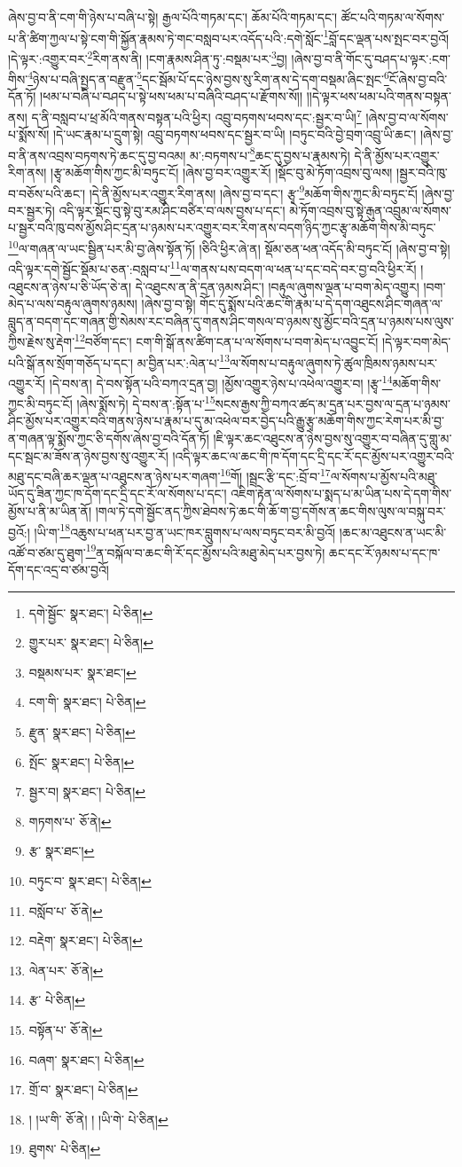 ཞེས་བྱ་བ་ནི་ངག་གི་ཉེས་པ་བཞི་པ་སྟེ། རྒྱལ་པོའི་གཏམ་དང་། ཆོམ་པོའི་གཏམ་དང་། ཚོང་པའི་གཏམ་ལ་སོགས་པ་ནི་ཚིག་ཀྱལ་པ་སྟེ་ངག་གི་སྐྱོན་རྣམས་ཏེ་གང་བསླབ་པར་འདོད་པའི་:དགེ་སློང་\footnote{དགེ་སྦྱོང་  སྣར་ཐང་།  པེ་ཅིན། }བློ་དང་ལྡན་པས་སྤང་བར་བྱའོ། །དེ་ལྟར་:འགྱུར་བར་\footnote{གྱུར་པར་  སྣར་ཐང་།  པེ་ཅིན། }རིག་ནས་ནི། །ངག་རྣམས་ཤིན་ཏུ་:བསྡམ་པར་\footnote{བསྡམས་པར་  སྣར་ཐང་། }བྱ། །ཞེས་བྱ་བ་ནི་གོང་དུ་བཤད་པ་ལྟར་:ངག་གིས་\footnote{ངག་གི་  སྣར་ཐང་།  པེ་ཅིན། }ཉེས་པ་བཞི་སྤྱད་ན་བརྫུན་\footnote{རྫུན་  སྣར་ཐང་།  པེ་ཅིན། }དང་སྦོམ་པོ་དང་ཉེས་བྱས་སུ་རིག་ནས་དེ་དག་བསྡམ་ཞིང་སྤང་\footnote{སྤོང་  སྣར་ཐང་།  པེ་ཅིན། }ངོ་ཞེས་བྱ་བའི་དོན་ཏོ། །ཕམ་པ་བཞི་པ་བཤད་པ་སྟེ་ཕས་ཕམ་པ་བཞིའི་བཤད་པ་རྫོགས་སོ།། །།དེ་ལྟར་ཕས་ཕམ་པའི་གནས་བསྟན་ནས། ད་ནི་བསླབ་པ་ཕྲ་མོའི་གནས་བསྟན་པའི་ཕྱིར། འབྲུ་བཏགས་ཕབས་དང་:སྦྱར་བ་ཡི།\footnote{སྦྱར་བ།  སྣར་ཐང་།  པེ་ཅིན། } །ཞེས་བྱ་བ་ལ་སོགས་པ་སྨོས་སོ། །དེ་ཡང་རྣམ་པ་དྲུག་སྟེ། འབྲུ་བཏགས་ཕབས་དང་སྦྱར་བ་ཡི། །བཏུང་བའི་བྱེ་བྲག་འབྲུ་ཡི་ཆང་། །ཞེས་བྱ་བ་ནི་ནས་འབྲས་བཏགས་ཏེ་ཆང་དུ་བྱ་བའམ། མ་:བཏགས་པ་\footnote{གཏགས་པ་  ཅོ་ནེ། }ཆང་དུ་བྱས་པ་རྣམས་ཏེ། དེ་ནི་མྱོས་པར་འགྱུར་རིག་ནས། །རྩྭ་མཆོག་གིས་ཀྱང་མི་བཏུང་ངོ། །ཞེས་བྱ་བར་འགྱུར་རོ། །སྡོང་བུ་མེ་ཏོག་འབྲས་བུ་ལས། །སྦྱར་བའི་ཁུ་བ་བཅོས་པའི་ཆང་། །དེ་ནི་མྱོས་པར་འགྱུར་རིག་ནས། །ཞེས་བྱ་བ་དང་། རྩྭ་\footnote{རྩ་  སྣར་ཐང་། }མཆོག་གིས་ཀྱང་མི་བཏུང་ངོ། །ཞེས་བྱ་བར་སྦྱར་ཏེ། འདི་ལྟར་སྡོང་བུ་སྟེ་བུ་རམ་ཤིང་བཙིར་བ་ལས་བྱས་པ་དང་། མེ་ཏོག་འབྲས་བུ་སྟེ་རྒུན་འབྲུམ་ལ་སོགས་པ་སྦྱར་བའི་ཁུ་བས་མྱོས་ཤིང་དྲན་པ་ཉམས་པར་འགྱུར་བར་རིག་ནས་བདག་ཉིད་ཀྱང་རྩྭ་མཆོག་གིས་མི་བཏུང་\footnote{བཏུང་བ་  སྣར་ཐང་།  པེ་ཅིན། }ལ་གཞན་ལ་ཡང་སྦྱིན་པར་མི་བྱ་ཞེས་སྟོན་ཏོ། །ཅིའི་ཕྱིར་ཞེ་ན། སྡོམ་ཅན་ཕན་འདོད་མི་བཏུང་ངོ། །ཞེས་བྱ་བ་སྟེ། འདི་ལྟར་དགེ་སྦྱོང་སྡོམ་པ་ཅན་:བསླབ་པ་\footnote{བསློབ་པ་  ཅོ་ནེ། }ལ་གནས་པས་བདག་ལ་ཕན་པ་དང་བདེ་བར་བྱ་བའི་ཕྱིར་རོ། །འཐུངས་ན་ཉེས་པ་ཅི་ཡོད་ཅེ་ན། དེ་འཐུངས་ན་ནི་དྲན་ཉམས་ཤིང་། །བརྟུལ་ཞུགས་ལྡན་པ་བག་མེད་འགྱུར། །བག་མེད་པ་ལས་བརྟུལ་ཞུགས་ཉམས། །ཞེས་བྱ་བ་སྟེ། གོང་དུ་སྨོས་པའི་ཆང་གི་རྣམ་པ་དེ་དག་འཐུངས་ཤིང་གཞན་ལ་བླུད་ན་བདག་དང་གཞན་གྱི་སེམས་རང་བཞིན་དུ་གནས་ཤིང་གསལ་བ་ཉམས་སུ་མྱོང་བའི་དྲན་པ་ཉམས་པས་ལུས་ཀྱིས་རྗེས་སུ་རྡེག་\footnote{བརྡེག་  སྣར་ཐང་།  པེ་ཅིན། }བཙོག་དང་། ངག་གི་སྒོ་ནས་ཚིག་ངན་པ་ལ་སོགས་པ་བག་མེད་པ་འབྱུང་ངོ། །དེ་ལྟར་བག་མེད་པའི་སྒོ་ནས་སྲོག་གཅོད་པ་དང་། མ་བྱིན་པར་:ལེན་པ་\footnote{ལེན་པར་  ཅོ་ནེ། }ལ་སོགས་པ་བརྟུལ་ཞུགས་ཏེ་ཚུལ་ཁྲིམས་ཉམས་པར་འགྱུར་རོ། །དེ་བས་ན། དེ་བས་སྟོན་པའི་བཀའ་དྲན་བྱ། །མྱོས་འགྱུར་ཉེས་པ་འཕེལ་འགྱུར་བ། །རྩྭ་\footnote{རྩ་  པེ་ཅིན། }མཆོག་གིས་ཀྱང་མི་བཏུང་ངོ། །ཞེས་སྨོས་ཏེ། དེ་བས་ན་:སྟོན་པ་\footnote{བསྟོན་པ་  ཅོ་ནེ། }སངས་རྒྱས་ཀྱི་བཀའ་ཚད་མ་དྲན་པར་བྱས་ལ་དྲན་པ་ཉམས་ཤིང་མྱོས་པར་འགྱུར་བའི་གནས་ཉེས་པ་རྣམ་པ་དུ་མ་འཕེལ་བར་བྱེད་པའི་རྒྱུ་རྩྭ་མཆོག་གིས་ཀྱང་རེག་པར་མི་བྱ་ན་གཞན་ལྟ་སྨོས་ཀྱང་ཅི་དགོས་ཞེས་བྱ་བའི་དོན་ཏོ། །ཇི་ལྟར་ཆང་འཐུངས་ན་ཉེས་བྱས་སུ་འགྱུར་བ་བཞིན་དུ་གླུ་མ་དང་སྦང་མ་ཟོས་ན་ཉེས་བྱས་སུ་འགྱུར་རོ། །འདི་ལྟར་ཆང་ལ་ཆང་གི་ཁ་དོག་དང་དྲི་དང་རོ་དང་མྱོས་པར་འགྱུར་བའི་མཐུ་དང་བཞི་ཆར་ལྡན་པ་འཐུངས་ན་ཉེས་པར་གཞག་\footnote{བཞག་  སྣར་ཐང་།  པེ་ཅིན། }གོ། །སྦྲང་རྩི་དང་:བྲོ་བ་\footnote{གྲོ་བ་  སྣར་ཐང་།  པེ་ཅིན། }ལ་སོགས་པ་མྱོས་པའི་མཐུ་ཡོད་དུ་ཟིན་ཀྱང་ཁ་དོག་དང་དྲི་དང་རོ་ལ་སོགས་པ་དང་། འཇིག་རྟེན་ལ་སོགས་པ་སྨད་པ་མ་ཡིན་པས་དེ་དག་གིས་མྱོས་པ་ནི་མ་ཡིན་ནོ། །གལ་ཏེ་དགེ་སྦྱོང་ནད་ཀྱིས་ཐེབས་ཏེ་ཆང་གི་ཆོ་ག་བྱ་དགོས་ན་ཆང་གིས་ལུས་ལ་བསྐུ་བར་བྱའོ:། །ཡི་ག་\footnote{། །ཡ་གི་  ཅོ་ནེ། ། །ཡི་གེ་  པེ་ཅིན། }འཆུས་པ་ཕན་པར་བྱ་ན་ཡང་ཁར་བླུགས་པ་ལས་བཏུང་བར་མི་བྱའོ། །ཆང་མ་འཐུངས་ན་ཡང་མི་འཚོ་བ་ཙམ་དུ་ཐུག་\footnote{ཐུགས་  པེ་ཅིན། }ན་བསྐོལ་བ་ཆང་གི་རོ་དང་མྱོས་པའི་མཐུ་མེད་པར་བྱས་ཏེ། ཆང་དང་རོ་ཉམས་པ་དང་ཁ་དོག་དང་འདྲ་བ་ཙམ་བྱའོ། 